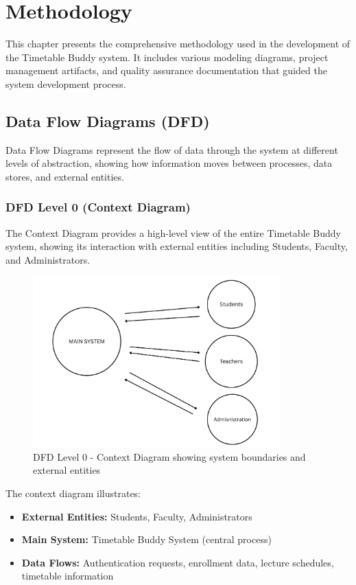 \chapter{Methodology}

This chapter presents the comprehensive methodology used in the development of the Timetable Buddy system. It includes various modeling diagrams, project management artifacts, and quality assurance documentation that guided the system development process.

\section{Data Flow Diagrams (DFD)}

Data Flow Diagrams represent the flow of data through the system at different levels of abstraction, showing how information moves between processes, data stores, and external entities.

\subsection{DFD Level 0 (Context Diagram)}

The Context Diagram provides a high-level view of the entire Timetable Buddy system, showing its interaction with external entities including Students, Faculty, and Administrators.

\begin{figure}[h]
    \centering
    \includegraphics[width=0.85\textwidth]{images/DFD Level 0.png}
    \caption{DFD Level 0 - Context Diagram showing system boundaries and external entities}
    \label{fig:dfd0}
\end{figure}

The context diagram illustrates:
\begin{itemize}[leftmargin=*]
    \item \textbf{External Entities:} Students, Faculty, Administrators
    \item \textbf{Main System:} Timetable Buddy System (central process)
    \item \textbf{Data Flows:} Authentication requests, enrollment data, lecture schedules, timetable information
\end{itemize}


